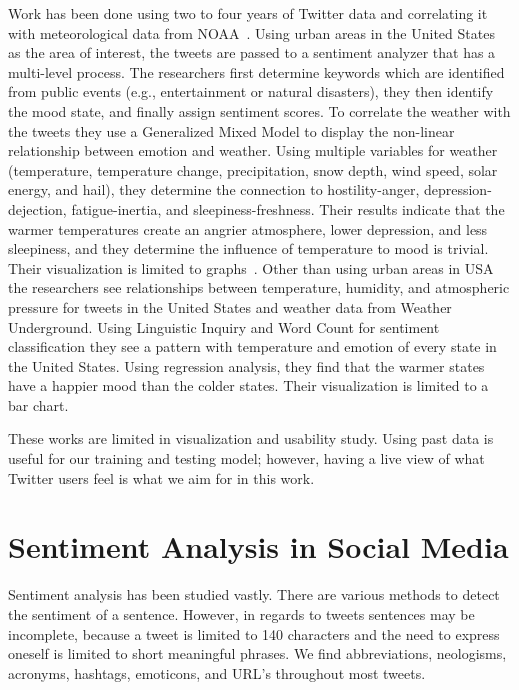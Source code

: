 Work has been done using two to four years of Twitter data and correlating it with meteorological data from NOAA~\cite{hannak2012tweetin,li2014nasty}. Using urban areas in the United States as the area of interest, the tweets are passed to a sentiment analyzer that has a multi-level process. The researchers first determine keywords which are identified from public events (e.g., entertainment or natural disasters), they then identify the mood state, and finally assign sentiment scores. To correlate the weather with the tweets they use a Generalized Mixed Model to display the non-linear relationship between emotion and weather. Using multiple variables for weather (temperature, temperature change, precipitation, snow depth, wind speed, solar energy, and hail), they determine the connection to hostility-anger, depression-dejection, fatigue-inertia, and sleepiness-freshness. Their results indicate that the warmer temperatures create an angrier atmosphere, lower depression, and less sleepiness, and they determine the influence of temperature to mood is trivial. Their visualization is limited to graphs~\cite{park2013mood}. Other than using urban areas in USA the researchers see relationships between temperature, humidity, and atmospheric pressure for tweets in the United States and weather data from Weather Underground. Using Linguistic Inquiry and Word Count for sentiment classification they see a pattern with temperature and emotion of every state in the United States. Using regression analysis, they find that the warmer states have a happier mood than the colder states. Their visualization is limited to a bar chart.

These works are limited in visualization and usability study. Using past data is useful for our training and testing model; however, having a live view of what Twitter users feel is what we aim for in this work.


\section{Sentiment Analysis in Social Media}

Sentiment analysis has been studied vastly. There are various methods to detect the sentiment of a sentence. However, in regards to tweets sentences may be incomplete, because a tweet is limited to 140 characters and the need to express oneself is limited to short meaningful phrases. We find abbreviations, neologisms, acronyms, hashtags, emoticons, and URL's throughout most tweets.

